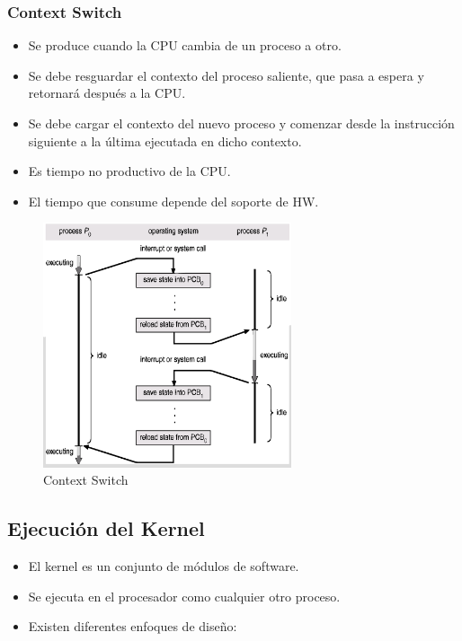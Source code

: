 \subsubsection{Context Switch}
\begin{itemize}
    \item Se produce cuando la CPU cambia de un proceso a otro.
    \item Se debe resguardar el contexto del proceso saliente, que pasa a espera y retornará después a la CPU.
    \item Se debe cargar el contexto del nuevo proceso y comenzar desde la instrucción siguiente a la última ejecutada en dicho contexto.
    \item Es tiempo no productivo de la CPU.
    \item El tiempo que consume depende del soporte de HW.
\end{itemize}
\begin{figure}[ht]
    \begin{center}
        \includegraphics[width=0.65\textwidth]{assets/ContextSwitch.eps}
    \end{center}
    \caption{Context Switch}\label{fig:}
\end{figure}

\subsection{Ejecución del Kernel}
\begin{itemize}
    \item El kernel es un conjunto de módulos de software.
    \item Se ejecuta en el procesador como cualquier otro proceso.
    \item Existen diferentes enfoques de diseño:
\end{itemize}
